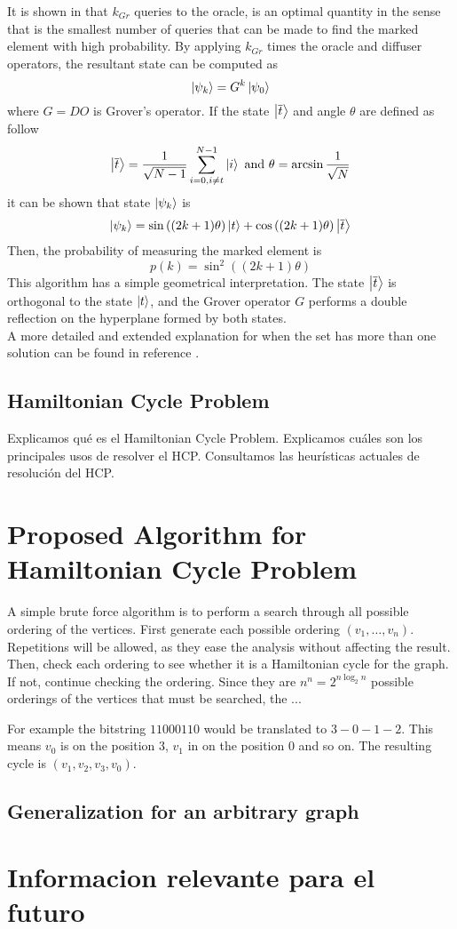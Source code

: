 \documentclass[10pt,a4paper]{article}
\begin{document}
It is shown in \cite{Grover_1997} that $k_{Gr}$ queries to the oracle, is an optimal quantity in the sense that is the smallest number of queries that can be made to find the marked element with high probability. By applying $k_{Gr}$ times the oracle and diffuser operators, the resultant state can be computed as
$$\ket{\psi_k} = G^{k}\ket{\psi_{0}}$$
where $G = DO$ is Grover's operator. If the state $\ket{\overline{t}}$ and angle $\theta$ are defined as follow
$$\ket{\overline{t}} = \frac{1}{\sqrt{N-1}}\sum_{i=0, i\neq t}^{N-1}\ket{i} \text{ and } \theta = \arcsin{\frac{1}{\sqrt{N}}}$$
it can be shown that state $\ket{\psi_k}$ is
$$\ket{\psi_k} = \sin{((2k+1)\theta)} \ket{t} + \cos{((2k+1)\theta)} \ket{\overline{t}}$$
Then, the probability of measuring the marked element is
$$p(k) = \sin^2{((2k+1)\theta)}$$
This algorithm has a simple geometrical interpretation. The state $\ket{\overline{t}}$ is orthogonal to the state $\ket{t}$, and the Grover operator $G$ performs a double reflection on the hyperplane formed by both states.\\
A more detailed and extended explanation for when the set has more than one solution can be found in reference \cite{Nielsen_Chuang_2010}.

\subsection{Hamiltonian Cycle Problem}
Explicamos qué es el Hamiltonian Cycle Problem.
Explicamos cuáles son los principales usos de resolver el HCP.
Consultamos las heurísticas actuales de resolución del HCP.

\section{Proposed Algorithm for Hamiltonian Cycle Problem}
A simple brute force algorithm is to perform a search through all possible ordering of the vertices. First generate each possible ordering $(v_1,\dots, v_n)$. Repetitions will be allowed, as they ease the analysis without affecting the result. Then, check each ordering to see whether it is a Hamiltonian cycle for the graph. If not, continue checking the ordering.
Since they are $n^n = 2^{n\log_2 n}$ possible orderings of the vertices that must be searched, the ...

For example the bitstring $11000110$ would be translated to $3-0-1-2$. This means $v_0$ is on the position $3$, $v_1$ in on the position $0$ and so on. The resulting cycle is $(v_1, v_2, v_3, v_0)$.
\subsection{Generalization for an arbitrary graph}



\section{Informacion relevante para el futuro}


 

\end{document}
